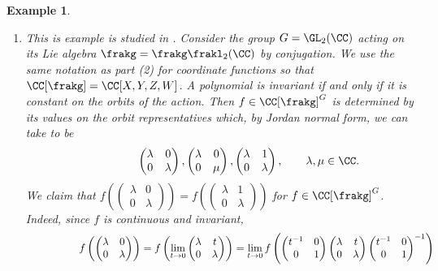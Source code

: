 \documentclass[12pt]{amsart}
\theoremstyle{plain}
\newtheorem{example}[theorem]{Example}
\begin{document}
\begin{example}
\begin{enumerate}
\item
This is example is studied in \cite{Kamgarpour21}.
Consider the group $G = \GL_2(\CC)$ acting on its Lie algebra $\frakg = \frakg\frakl_2(\CC)$ by conjugation.
We use the same notation as part (2) for coordinate functions so that $\CC[\frakg] = \CC[X, Y, Z, W]$.
A polynomial is invariant if and only if it is constant on the orbits of the action.
Then $f \in \CC[\frakg]^G$ is determined by its values on the orbit representatives which, by Jordan normal form, we can take to be
$$
\hspace{\labelwidth} \hspace{\labelsep} \hspace{\leftmargin}
\begin{pmatrix}
	\lambda & 0 \\
	0 & \lambda 
\end{pmatrix},
\begin{pmatrix}
	\lambda & 0 \\
	0 & \mu 
\end{pmatrix},
\begin{pmatrix}
	\lambda & 1 \\
	0 & \lambda 
\end{pmatrix}, \qquad \lambda, \mu \in \CC.
$$
We claim that \( f\left( \begin{pmatrix} \lambda & 0 \\ 0 & \lambda \end{pmatrix} \right) = f\left( \begin{pmatrix} \lambda & 1 \\ 0 & \lambda \end{pmatrix} \right) \) for $f \in \CC[\frakg]^G$. Indeed, since $f$ is continuous and invariant,
\begin{align*}
\hspace{\labelwidth} \hspace{\labelsep} \hspace{\leftmargin}
f\left( \begin{pmatrix} \lambda & 0 \\ 0 & \lambda \end{pmatrix} \right) 
&= f\left( \lim_{t \to 0} \begin{pmatrix} \lambda & t \\ 0 & \lambda \end{pmatrix} \right) 
= \lim_{t \to 0} f\left(\begin{pmatrix} t^{-1} & 0 \\ 0 & 1\end{pmatrix}\begin{pmatrix} \lambda & t \\ 0 & \lambda \end{pmatrix} \begin{pmatrix} t^{-1} & 0 \\ 0 & 1\end{pmatrix}^{-1} \right) \\

\end{align*}
\end{enumerate}
\end{example}
\end{document}
